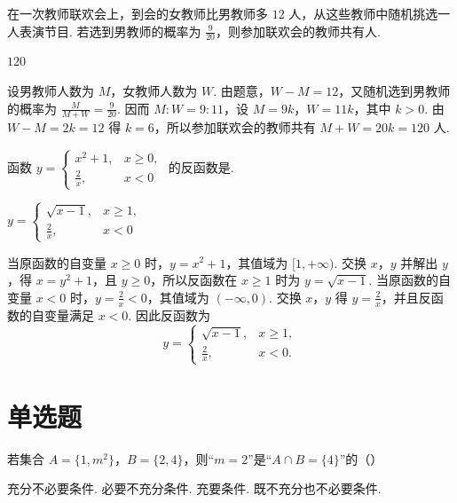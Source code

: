 \begin{problem}
在一次教师联欢会上，到会的女教师比男教师多 \(12\) 人，从这些教师中随机挑选一人表演节目. 若选到男教师的概率为 \(\frac{9}{20}\)，则参加联欢会的教师共有\fillinblank{}人.
\end{problem}

\begin{answer}
\(120\)
\end{answer}

\begin{solution}
设男教师人数为 \(M\)，女教师人数为 \(W\). 由题意，\(W-M=12\)，又随机选到男教师的概率为 \(\frac{M}{M+W}=\frac{9}{20}\). 因而 \(M:W=9:11\)，设 \(M=9k\)，\(W=11k\)，其中 \(k>0\). 由 \(W-M=2k=12\) 得 \(k=6\)，所以参加联欢会的教师共有 \(M+W=20k=120\) 人.
\end{solution}

\begin{problem}
函数 \(y=
\begin{cases}
x^2+1, & x\geqslant 0,\\
\frac{2}{x}, & x<0
\end{cases}
\)
的反函数是\fillinblank{}.
\end{problem}

\begin{answer}
\(y=
\begin{cases}
\sqrt{x-1}, & x\geqslant 1,\\
\frac{2}{x}, & x<0
\end{cases}
\)
\end{answer}

\begin{solution}
当原函数的自变量 \(x\geqslant0\) 时，\(y=x^2+1\)，其值域为 \([1,+\infty)\). 交换 \(x\)，\(y\) 并解出 \(y\)，得 \(x=y^2+1\)，且 \(y\geqslant0\)，所以反函数在 \(x\geqslant1\) 时为 \(y=\sqrt{x-1}\). 当原函数的自变量 \(x<0\) 时，\(y=\frac2x<0\)，其值域为 \((-\infty,0)\). 交换 \(x\)，\(y\) 得 \(y=\frac2x\)，并且反函数的自变量满足 \(x<0\). 因此反函数为
\[
y=
\begin{cases}
\sqrt{x-1}, & x\geqslant1,\\
\frac2x, & x<0.
\end{cases}
\]
\end{solution}

\section{单选题}

\begin{problem}
若集合 \(A=\{1,m^2\}\)，\(B=\{2,4\}\)，则“\(m=2\)”是“\(A\cap B=\{4\}\)”的（\quad）

\choices
    {充分不必要条件.}
    {必要不充分条件.}
    {充要条件.}
    {既不充分也不必要条件.}
\end{problem}

